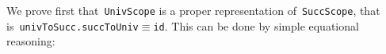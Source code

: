 \documentclass[9pt,preprint,authoryear]{sigplanconf}
\begin{document}
%
We prove first that{~}\textcolor[rgb]{0,0,0.80}{\texttt{UnivScope}} is a proper representation
    of{~}\textcolor[rgb]{0,0,0.80}{\texttt{SuccScope}}, that is{~}\textcolor[rgb]{0,0,0.80}{\texttt{univToSucc}}\textcolor[rgb]{0,0,0.80}{\texttt{\mbox{\hspace{0.50em}}}}\textcolor[cmyk]{0,0.65,0.99,0}{\texttt{.}}\textcolor[rgb]{0,0,0.80}{\texttt{\mbox{\hspace{0.50em}}}}\textcolor[rgb]{0,0,0.80}{\texttt{succToUniv}}\textcolor[rgb]{0,0,0.80}{\texttt{\mbox{\hspace{0.50em}}}}\textcolor[cmyk]{0,0.65,0.99,0}{\texttt{$ \equiv $}}\textcolor[rgb]{0,0,0.80}{\texttt{\mbox{\hspace{0.50em}}}}\textcolor[rgb]{0,0,0.80}{\texttt{id}}. This can
    be done by simple equational reasoning{:}%


%
%


{\nopagebreak }
\end{document}
